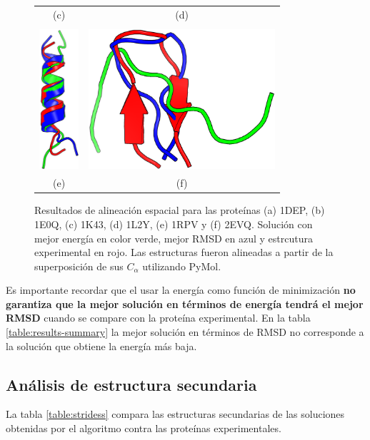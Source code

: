 \begin{figure}
\begin{tabular}{c c}
(c) & (d) \\ \\
\includegraphics[height=5.2cm]{images/rmsd-1RPV.png} & \includegraphics[height=5.2cm]{images/rmsd-2EVQ.png} \\
(e) & (f) \\

\end{tabular}
\caption[Alineación espacial de estructuras]{Resultados de alineación espacial para las proteínas (a) 1DEP, (b) 1E0Q, (c) 1K43, (d) 1L2Y, (e) 1RPV y (f) 2EVQ. Solución con mejor energía en color verde, mejor RMSD en azul y estrcutura experimental en rojo. Las estructuras fueron alineadas a partir de la superposición de sus $C_{\alpha}$ utilizando PyMol.}
\label{fig:rmsd-proteinas}
\end{figure}


Es importante recordar que el usar la energía como función de minimización \textbf{no garantiza que la mejor solución en términos de energía tendrá el mejor RMSD} cuando se compare con la proteína experimental. En la tabla \ref{table:results-summary} la mejor solución en términos de RMSD no corresponde a la solución que obtiene la energía más baja.

\subsection{Análisis de estructura secundaria}

La tabla \ref{table:stridess} compara las estructuras secundarias de las soluciones obtenidas por el algoritmo contra las proteínas experimentales. 

